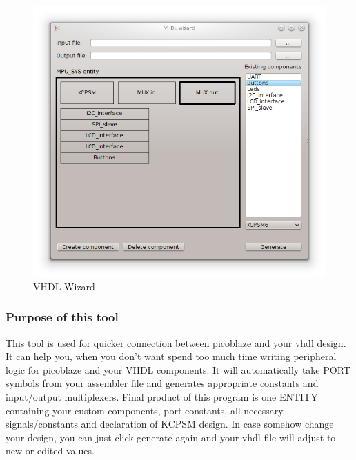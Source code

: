\begin{figure}[h]
    \centering
    \includegraphics[width=.5\textwidth]{img/VHDL_wizard.png}
    \caption{VHDL Wizard}
\end{figure}

\subsubsection{Purpose of this tool}
    This tool is used for quicker connection between picoblaze and your vhdl design. It can help you, when you don't want spend too much time writing  peripheral logic for picoblaze
    and your VHDL components. It will automatically take PORT symbols from your assembler file and generates appropriate constants and input/output multiplexers. Final product of
    this program is one ENTITY containing your custom components, port constants, all necessary signals/constants and declaration of KCPSM design. In case somehow change your design, you
    can just click generate again and your vhdl file will adjust to new or edited values.  

